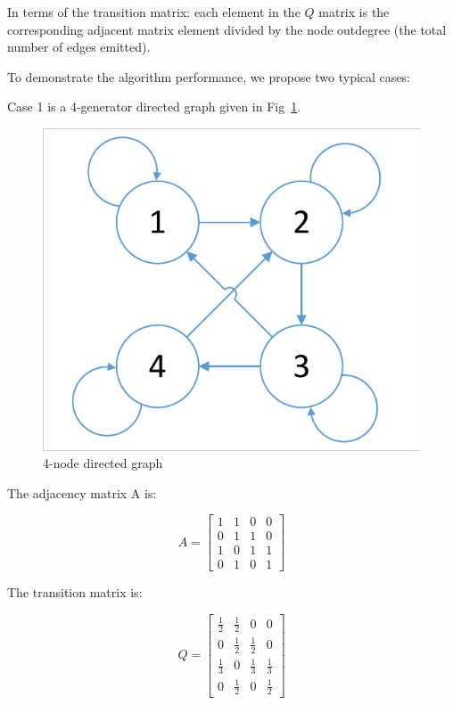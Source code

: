 \documentclass[conference]{IEEEtran}
\begin{document}
In terms of the transition matrix: each element in the $Q$ matrix is the corresponding adjacent matrix element divided by the node outdegree (the total number of edges emitted).

To demonstrate the algorithm performance, we propose two typical cases:

Case 1 is a 4-generator directed graph given in Fig~\ref{fig:Directed-graph}.

\begin{figure}[htbp] %
    \centering
    \includegraphics[width=0.6\columnwidth]{Directed-graph.pdf}
    \caption{4-node directed graph}
    \label{fig:Directed-graph}
\end{figure}

The adjacency matrix A is:

\begin{equation}
    A=\left[\begin{array}{cccc}
    {1} & {1} & {0} & {0} \\
    {0} & {1} & {1} & {0} \\
    {1} & {0} & {1} & {1} \\
    {0} & {1} & {0} & {1}
    \end{array}\right]
\end{equation}

The transition matrix is:

\begin{equation}
    Q=\left[\begin{array}{cccc}
    {\frac{1}{2}} & {\frac{1}{2}} & {0} & {0} \\
    {0} & {\frac{1}{2}} & {\frac{1}{2}} & {0} \\
    {\frac{1}{3}} & {0} & {\frac{1}{3}} & {\frac{1}{3}} \\
    {0} & {\frac{1}{2}} & {0} & {\frac{1}{2}}
    \end{array}\right]
\end{equation}
\end{document}
